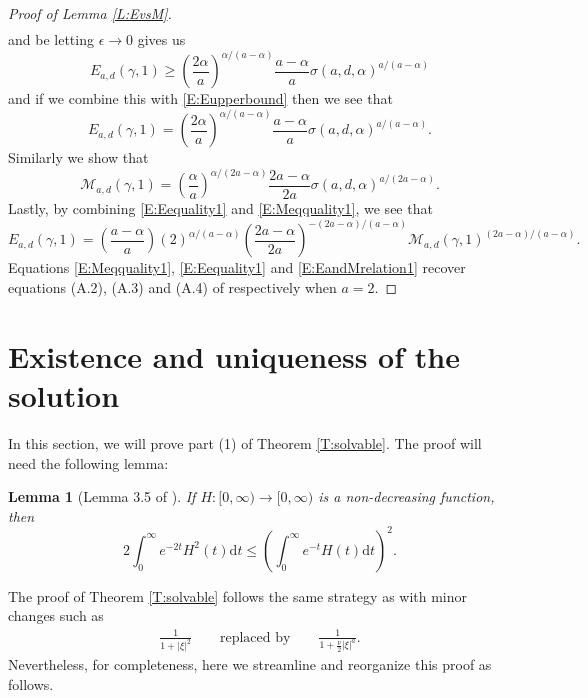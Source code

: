 \documentclass[a4paper,11pt]{article}
\numberwithin{equation}{section}
\numberwithin{equation}{section}
\theoremstyle{plain}
\newtheorem{lemma}[theorem]{Lemma}
\theoremstyle{definition}
\newcommand{\ud}{\ensuremath{\mathrm{d} }}
\begin{document}
\begin{proof}[Proof of Lemma \ref{L:EvsM}]
\begin{align*}
  \end{align*}
  and be letting $\epsilon \to 0$ gives us
  \begin{equation}\label{E:Elowerbound}
    E_{a,d}(\gamma,1) \ge\left(\frac{2\alpha}{a}\right)^{\alpha/(a-\alpha)}\frac{a-\alpha}{a}\sigma(a,d,\alpha)^{a/(a-\alpha)}
  \end{equation}
  and if we combine this with \eqref{E:Eupperbound} then we see that
  \begin{equation}\label{E:Eequality1}
    E_{a,d}(\gamma,1) = \left(\frac{2\alpha}{a}\right)^{\alpha/(a-\alpha)}\frac{a-\alpha}{a}\sigma(a,d,\alpha)^{a/(a-\alpha)}.
  \end{equation}
  Similarly we show that
  \begin{equation}\label{E:Meqquality1}
    \mathcal{M}_{a,d}(\gamma,1) = \left( \frac{\alpha}{a}\right)^{\alpha/(2a-\alpha)} \frac{2a-\alpha}{2a}\sigma(a,d,\alpha)^{a/(2a-\alpha)}.
  \end{equation}
  Lastly, by combining \eqref{E:Eequality1} and \eqref{E:Meqquality1}, we see that
  \begin{equation} \label{E:EandMrelation1}
    E_{a,d}(\gamma,1) = \left( \frac{a-\alpha}{a}\right)(2)^{\alpha/(a-\alpha)}\left( \frac{2a-\alpha}{2a} \right)^{-(2a-\alpha)/(a-\alpha)}\mathcal{M}_{a,d}(\gamma,1)^{(2a-\alpha)/(a-\alpha)} .
  \end{equation}
  Equations \eqref{E:Meqquality1}, \eqref{E:Eequality1} and \eqref{E:EandMrelation1} recover
  equations (A.2), (A.3) and (A.4) of \cite{15AIHP} respectively when $a=2$.
\end{proof}

\section{Existence and uniqueness of the solution} \label{S:solvable}

In this section, we will prove part (1) of Theorem \ref{T:solvable}. The proof will need the
following lemma:

\begin{lemma}[Lemma 3.5 of \cite{BCC21}] \label{L:doubleExp}
  If $H:[0,\infty) \to [0,\infty)$ is a non-decreasing function, then
  \begin{equation} \label{E:doubleExp}
    2\int_0^\infty e^{-2t}H^2(t) \ud t \le \left( \int_0^\infty e^{-t} H(t) \ud t \right)^2.
  \end{equation}
\end{lemma}

The proof of Theorem \ref{T:solvable} follows the same strategy as \cite[Section 3]{BCC21} with
minor changes such as
\begin{align} \label{E:Changes}
  \frac{1}{1+|\xi|^2} \qquad \text{replaced by} \qquad \frac{1}{1+\frac{\nu}{2}|\xi|^a}.
\end{align}
Nevertheless, for completeness, here we streamline and reorganize this proof as follows.
\end{document}

